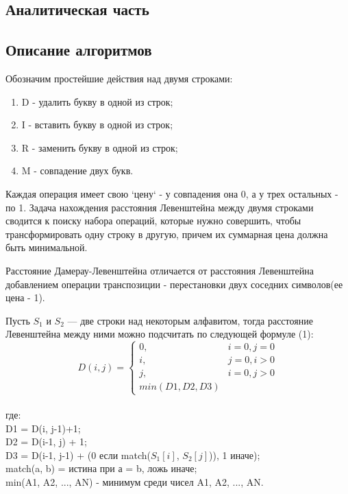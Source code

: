 \documentclass[a4paper, 14pt]{article}
\begin{document}
    \begin{center}
    	\newpage
        \section{Аналитическая часть}
		\parindent=1cm
        \subsection{Описание алгоритмов}
        \begin{flushleft}
        Обозначим простейшие действия над двумя строками:
        \begin{enumerate}
        	\item D - удалить букву в одной из строк;
        	\item I - вставить букву в одной из строк;
        	\item R - заменить букву в одной из строк;
        	\item M - совпадение двух букв.
        \end{enumerate}
        \parindent=1cm
        Каждая операция имеет свою `цену` - у совпадения она 0, а у трех остальных - по 1.
        Задача нахождения расстояния Левенштейна между двумя строками сводится к поиску набора операций, которые нужно совершить, чтобы трансформировать одну строку в другую, причем их суммарная цена должна быть минимальной.
        
        Расстояние Дамерау-Левенштейна отличается от расстояния Левенштейна добавлением операции транспозиции - перестановки двух соседних символов(ее цена - 1).	
        
        Пусть $S_{1}$ и $S_{2}$ — две строки над некоторым алфавитом, тогда расстояние Левенштейна между ними можно подсчитать по следующей формуле (1):
        \begin{equation}
			D(i,j) = \left\{ \begin{array}{ll}
 			0, & \textrm{$i = 0, j = 0$}\\
 			i, & \textrm{$j = 0, i > 0$}\\
 			j, & \textrm{$i = 0, j > 0$}\\
			min(D1,D2,D3)
  			\end{array} \right.
		\end{equation}
		\\где:\\ 
		D1 = D(i, j-1)+1;\\
		D2 = D(i-1, j) + 1;\\
		D3 = D(i-1, j-1) + (0 если match($S_{1}[i]$, $S_{2}[j]$)), 1 иначе);\\
		match(a, b) = истина при а = b, ложь иначе;\\
		min(A1, A2, ..., AN) - минимум среди чисел A1, A2, ..., AN.\\
		

\end{flushleft}
\end{center}
\end{document}
